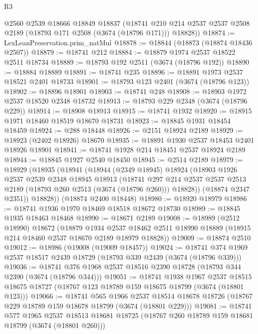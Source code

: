 \begin{lexlean}{R3}
\begin{coremodule}
      @2560
      @2539
      @18666
      @18849
      @18837
      (@18741 @210 @214 @2537 @2537 @2508 @2189 (@18793 @171 @2508 (@3674 (@18796 @171))) @18828))
@18874 := LexLeanPreservation.prim_natMul
@18878 := @18844 (@18873 (@18874 @18436 @2507))
@18879 := @18741 @212
@18884 := @18879 @1974 @2537 @18522 @2511 @18734
@18889 := @18793 @192 @2511 (@3674 (@18796 @192))
@18890 := @18884 @18889
@18891 := @18741 @235
@18896 := @18891 @1973 @2537 @18521 @2401 @18733
@18901 := @18793 @123 @2401 (@3674 (@18796 @123))
@18902 := @18896 @18901
@18903 := @18741 @248
@18908 := @18903 @1972 @2537 @18520 @2348 @18732
@18913 := @18793 @229 @2348 (@3674 (@18796 @229))
@18914 := @18908 @18913
@18915 := @18741 @1932
@18920 := @18915 @1971 @18460 @18519 @18670 @18731
@18923 := @18845 @1931 @18454 @18459
@18924 := @288 @18448
@18926 := @2151 @18924 @2189
@18929 := @18923 (@2402 @18926) @18670
@18935 := @18891 @1930 @2537 @18453 @2401 @18926 @18901
@18941 := @18741 @1928 @214 @18451 @2537 @18924 @2189
@18944 := @18845 @1927 @2540 @18450
@18945 := @2514 @2189
@18979 := @18929
    (@18935
      (@18941
        (@18944
          (@2349 @18945)
          @18924
          (@18903
            @1926
            @2537
            @2539
            @2348
            @18945
            @18913
            (@18741
              @297
              @214
              @2537
              @2537
              @2513
              @2189
              (@18793 @260 @2513 (@3674 (@18796 @260)))
              @18828))
          (@18874 @2347 @2351))
        @18828))
    (@18874 @2400 @18448)
@18980 := @18920 @18979
@18986 := @18741 @1936 @1970 @18469 @18518 @18672 @18730
@18989 := @18845 @1935 @18463 @18468
@18990 := @18671 @2189
@19008 := @18989
    (@2512 @18990)
    @18672
    (@18879
      @1934
      @2537
      @18462
      @2511
      @18990
      @18889
      (@18915 @214 @18460 @2537 @18670 @2189 @18979 @18828))
@19009 := @18874 @2510
@19012 := @18986 (@19008 (@19009 @18457))
@19024 := @18741 @374 @1969 @2537 @18517 @2439 @18729 (@18793 @339 @2439 (@3674 (@18796 @339)))
@19036 := @18741 @376 @1968 @2537 @18516 @2390 @18728 (@18793 @344 @2390 (@3674 (@18796 @344)))
@19051 := @18741
    @1938
    @1967
    @2537
    @18515
    @18675
    @18727
    (@18767 @123 @18789 @159 @18675 @18799 (@3674 (@18801 @123)))
@19066 := @18741
    @565
    @1966
    @2537
    @18514
    @18678
    @18726
    (@18767 @229 @18789 @159 @18678 @18799 (@3674 (@18801 @229)))
@19081 := @18741
    @577
    @1965
    @2537
    @18513
    @18681
    @18725
    (@18767 @260 @18789 @159 @18681 @18799 (@3674 (@18801 @260)))

\end{coremodule}
\end{lexlean}
